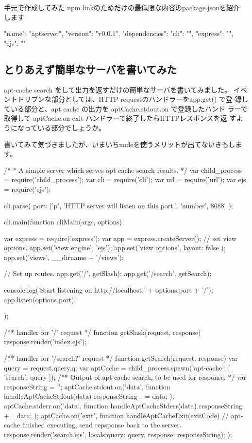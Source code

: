 \documentclass[mingoth,a4paper]{jsarticle}
\begin{document}
手元で作成してみた npm linkのためだけの最低限な内容のpackage.jsonを紹介
します

\begin{commandline}
{
    "name": "aptserver",
    "version": "v0.0.1",
    "dependencies": {
	"cli": "",
	"express": "",
	"ejs": ""
    }
}
\end{commandline}


\subsection{とりあえず簡単なサーバを書いてみた}

apt-cache search をして出力を返すだけの簡単なサーバを書いてみました。
イベントドリブンな部分としては、HTTP requestのハンドラーをapp.get() で登
録している部分と、apt cache の出力を aptCache.stdout.on で登録したハンド
ラーで取得して aptCache.on exit ハンドラーで終了したらHTTPレスポンスを返
すようになっている部分でしょうか。

書いてみて気づきましたが、いまいちnodeを使うメリットが出てないきもしま
す。


\begin{commandline}
/*
 * A simple server which serves apt cache search results.
 */
var child_process = require('child_process');
var cli = require('cli');
var url = require('url');
var ejs = require('ejs');

cli.parse({
    port: ['p', 'HTTP server will listen on this port.', 'number', 8088]
});

cli.main(function cliMain(args, options) {
    var express = require('express');
    var app = express.createServer();
    // set view options.
    app.set('view engine', 'ejs');
    app.set('view options', { layout: false });
    app.set('views', __dirname + '/views');

    // Set up routes.
    app.get('/', getSlash);
    app.get('/search', getSearch);

    console.log('Start listening on http://localhost:' + options.port + '/');
    app.listen(options.port);
});

/** handler for '/' request */
function getSlash(request, response) {
    response.render('index.ejs');
}

/** handler for '/search?' request */
function getSearch(request, response) {
    var query = request.query.q;
    var aptCache = child_process.spawn('apt-cache',
				       [ 'search', query ]);
    /** Output of apt-cache search, to be used for response. */
    var responseString = '';
    aptCache.stdout.on('data', function handleAptCacheStdout(data) {
	responseString += data;
    });
    aptCache.stderr.on('data', function handleAptCacheStderr(data) {
	responseString += data;
    });
    aptCache.on('exit', function handleAptCacheExit(exitCode) {
	// apt-cache finished executing, send repsponse back to the server.
	response.render('search.ejs',
			{locals:{query: query,
				 response: responseString}});
    });
}
\end{commandline}
\end{document}
